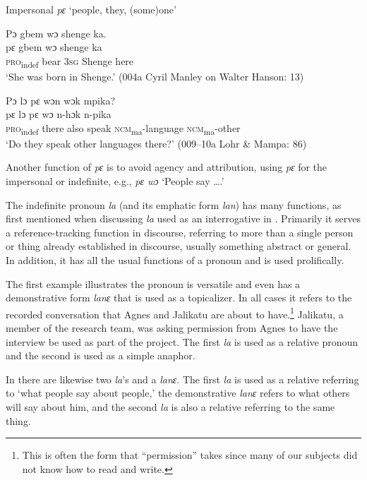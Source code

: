\ea%
    \label{ex:69}
    Impersonal \textit{pɛ} ‘people, they, (some)one'
    
  \ea \label{ex:69a}
  Pɔ gbem wɔ shenge ka.\\
  \gll pɛ      gbem  wɔ    shenge  ka\\
  \textsc{pro}\textsubscript{indef}  bear  \textsc{3sg}  Shenge  here\\
\glt ‘She was born in Shenge.' (004a Cyril Manley on Walter Hanson: 13)

  \ex \label{ex:69b} Pɔ lɔ pɛ wɔn wɔk mpika?\\
  \gll pɛ      lɔ    pɛ    wɔ      n-hɔk            n-pika\\
\textsc{pro}\textsubscript{indef}  there  also  speak    \textsc{ncm}\textsubscript{ma}{}-language    \textsc{ncm}\textsubscript{ma}{}-other\\
\glt ‘Do they speak other languages there?' (009--10a Lohr \& Mampa: 86)
\z
\z

Another function of \textit{pɛ} is to avoid agency and attribution, using \textit{pɛ} for the impersonal or indefinite, e.g., \textit{pɛ wɔ} ‘People say ….'

The indefinite pronoun \textit{la} (and its emphatic form \textit{lan}) has many functions, as first mentioned when discussing \textit{la} used as an interrogative in . Primarily it serves a reference-tracking function in discourse, referring to more than a single person or thing already established in discourse, usually something abstract or general. In addition, it has all the usual functions of a pronoun and is used prolifically.

The first example  illustrates the pronoun is versatile and even has a demonstrative form \textit{lanɛ} that is used as a topicalizer. In all cases it refers to the recorded conversation that Agnes and Jalikatu are about to have.\footnote{This is often the form that “permission” takes since many of our subjects did not know how to read and write.} Jalikatu, a member of the research team, was asking permission from Agnes to have the interview be used as part of the project. The first \textit{la} is used as a relative pronoun and the second is used as a simple anaphor.

In  there are likewise two \textit{la}'s and a \textit{lanɛ}. The first \textit{la} is used as a relative referring to ‘what people say about people,' the demonstrative \textit{lanɛ} refers to what others will say about him, and the second \textit{la} is also a relative referring to the same thing.

